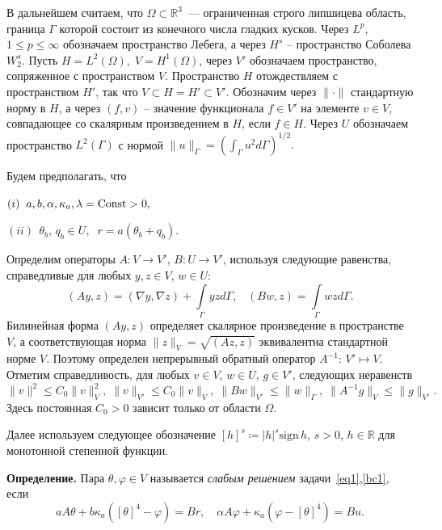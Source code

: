 \documentclass[12pt]{article}
\begin{document}
    В дальнейшем считаем, что $\Omega\subset \mathbb{R}^3$~--- ограниченная строго липшицева
    область, граница $\Gamma$ которой состоит из конечного числа гладких кусков.
    Через $L^p$, $1 \leq p \leq \infty$ обозначаем пространство Лебега,
    а через $H^s$ -- пространство Соболева $W^s_2$.
    Пусть $H = L^2(\Omega), \; V = H^1(\Omega)$, через $V'$ обозначаем
    пространство, сопряженное с пространством $V$.
    Пространство $H$ отождествляем с пространством $H'$, так что $V \subset H = H' \subset V'$.
    Обозначим через $\|\cdot\|$ стандартную норму
    в $H$, а через $(f,v)$ -- значение функционала $f\in V'$ на элементе $v\in V$,
    совпадающее со скалярным произведением в $H$, если $f\in H$.
    Через $U$ обозначаем пространство $L^2(\Gamma)$ с нормой
    $\|u\|_\Gamma=\left(\int_\Gamma u^2 d\Gamma\right)^{1/2}.$



    Будем предполагать, что

    $(i) \;\; a,b,\alpha,\kappa_a, \lambda={\rm Const}> 0 ,$

    $(ii) \;\, \theta_b, \,q_b \in U,\;\; r=a(\theta_b+q_b).$


    Определим операторы $A\colon V \to V'$, $B\colon U \to V'$, используя
    следующие равенства, справедливые для любых $y,z \in V$, $w\in U$:
    \[
        (Ay,z) = (\nabla y, \nabla z) + \int\limits_{\Gamma}yz d\Gamma, \;\;\; (Bw, z)
        = \int\limits_{\Gamma}wz d\Gamma.
    \]
    Билинейная форма $(Ay,z)$ определяет скалярное произведение в пространстве $V$,
    а соответствующая норма $\|z\|_V=\sqrt{(Az,z)}$ эквивалентна стандартной норме $V$.
    Поэтому определен непрерывный обратный оператор
    $A^{-1}:\,V'\mapsto V.$ Отметим справедливость, для любых
    $v\in V$, $w\in U$, $g\in V'$, следующих неравенств
    \begin{equation}
        \label{E}
        \|v\|^2\leq C_0\|v\|^2_V,\; \|v\|_{V'}\leq C_0\|v\|_V,\; \|Bw\|_{V'}\leq \|w\|_\Gamma,\;
        \|A^{-1}g\|_{V}\leq \|g\|_{V'}.
    \end{equation}
    Здесь постоянная $C_0>0$ зависит только от области $\Omega.$




    Далее используем следующее обозначение
    $[h]^s \coloneqq |h|^s \mathrm{sign}\, h$,
    $s > 0$, $h \in \mathbb R$ для монотонной степенной функции.


    \textbf{Определение.} Пара $\theta, \varphi\in V$
    называется \textit{слабым решением} задачи~\eqref{eq1},\eqref{bc1}, если
    \begin{equation}
        \label{w1}
        a A \theta + b \kappa_a ([\theta]^4 - \varphi ) = Br,\quad
        \alpha A \varphi + \kappa_a (\varphi - [\theta]^4)  = Bu.
    \end{equation}
\end{document}
